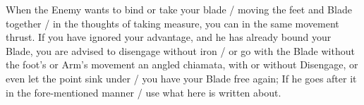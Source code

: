 

When the Enemy wants to bind or take your blade / moving the feet and
Blade together / in the thoughts of taking measure, you can in the
same movement thrust. If you have ignored your advantage, and he has
already bound your Blade, you are advised to disengage without iron /
or go with the Blade without the foot's or Arm's movement an angled
chiamata, with or without
Disengage, or even let the point sink under / you have your Blade
free again; If he goes after it in the fore-mentioned manner / use
what here is written about.